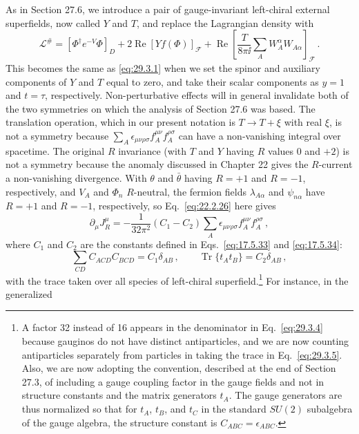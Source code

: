 As in Section 27.6, we introduce a pair of gauge-invariant left-chiral
external superfields, now called \(Y\) and \(T\), and replace the
Lagrangian density with
\begin{equation}
  \mathcal{L}^{\#}
  =
  \left[\Phi^\dagger e^{-V}\Phi\right]_D
  +2\operatorname{Re}\left[Yf(\Phi)\right]_{\mathcal{F}}
  +\operatorname{Re}
  \left[
    \frac{T}{8\pi \ii}
    \sum_AW_A^\alpha W_{A\alpha}
  \right]_{\mathcal{F}}\,.
  \tag{29.3.3}\label{eq:29.3.3}
\end{equation}
This becomes the same as \eqref{eq:29.3.1} when we set the spinor and
auxiliary components of \(Y\) and \(T\) equal to zero, and take their
scalar components as \(y=1\) and \(t=\tau\), respectively.
Non-perturbative effects will in general invalidate both of the two
symmetries on which the analysis of Section 27.6 was based. The translation
operation, which in our present notation is \(T\longrightarrow T+\xi\)
with real \(\xi\), is not a symmetry because
\(\sum_A\epsilon_{\mu\nu\rho\sigma}f_A^{\mu\nu}f_A^{\rho\sigma}\) can
have a non-vanishing integral over spacetime. The original \(R\) invariance
(with \(T\) and \(Y\) having \(R\) values 0 and \(+2\)) is not a symmetry
because the anomaly discussed in Chapter 22 gives the \(R\)-current a
non-vanishing divergence. With \(\theta\) and \(\bar\theta\) having
\(R=+1\) and \(R=-1\), respectively, and \(V_A\) and \(\Phi_n\)
\(R\)-neutral, the fermion fields \(\lambda_{A\alpha}\) and
\(\psi_{n\alpha}\)
have \(R=+1\) and \(R=-1\), respectively, so Eq.~\eqref{eq:22.2.26}
here gives
\begin{equation}
  \partial_\mu J_R^\mu
  =
  -\frac{1}{32\pi^2}(C_1-C_2)
  \sum_A\epsilon_{\mu\nu\rho\sigma}
  f_A^{\mu\nu}f_A^{\rho\sigma}\,,
  \tag{29.3.4}\label{eq:29.3.4}
\end{equation}
where \(C_1\) and \(C_2\) are the constants defined in
Eqs.~\eqref{eq:17.5.33} and \eqref{eq:17.5.34}:
\begin{equation}
  \sum_{CD}C_{ACD}C_{BCD}=C_1\delta_{AB}\,,
  \qquad
  \operatorname{Tr}\{t_A t_B\}=C_2\delta_{AB}\,,
  \tag{29.3.5}\label{eq:29.3.5}
\end{equation}
with the trace taken over all species of left-chiral
superfield.\footnote{A factor 32 instead of 16 appears in the denominator
in Eq.~\eqref{eq:29.3.4} because gauginos do not have distinct
antiparticles, and we are now counting antiparticles separately from
particles in taking the trace in Eq.~\eqref{eq:29.3.5}. Also, we are now
adopting the convention, described at the end of Section 27.3, of including
a gauge coupling factor in the gauge fields and not in structure constants
and the matrix generators \(t_A\). The gauge generators are thus normalized
so that for \(t_A\), \(t_B\), and \(t_C\) in the standard \(SU(2)\)
subalgebra of the gauge algebra, the structure constant is
\(C_{ABC}=\epsilon_{ABC}\).} For instance, in the generalized
